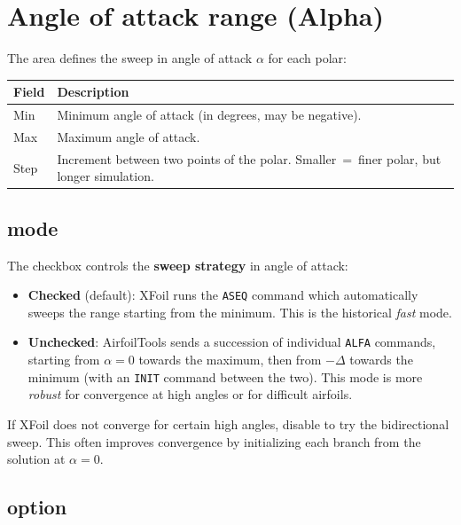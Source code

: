 \section{Angle of attack range (Alpha)}

The  area defines the sweep in angle of attack
$\alpha$ for each polar:

\begin{tabularx}{\linewidth}{l X}
    \toprule
    \textbf{Field} & \textbf{Description} \\
    \midrule
    Min  & Minimum angle of attack (in degrees, may be negative). \\
    Max  & Maximum angle of attack. \\
    Step & Increment between two points of the polar. Smaller~=~finer
           polar, but longer simulation.\\
    \bottomrule
\end{tabularx}

\subsection*{ mode}

The  checkbox controls the \textbf{sweep strategy}
in angle of attack:

\begin{itemize}
    \item \textbf{Checked} (default): XFoil runs the
        \texttt{ASEQ} command which automatically sweeps the range
        starting from the minimum. This is the historical \emph{fast} mode.
    \item \textbf{Unchecked}: AirfoilTools sends a succession of
        individual \texttt{ALFA} commands, starting from
        $\alpha=0$ towards the maximum, then from $-\Delta$ towards the
        minimum (with an \texttt{INIT} command between the two).
        This mode is more \emph{robust} for convergence at
        high angles or for difficult airfoils.
\end{itemize}

\begin{astuce}
If XFoil does not converge for certain high angles, disable
 to try the bidirectional sweep. This
often improves convergence by initializing each branch
from the solution at $\alpha=0$.
\end{astuce}

\subsection*{ option}

